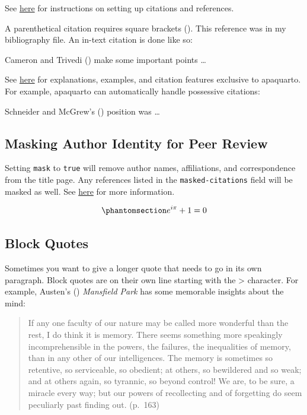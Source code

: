 \documentclass[
  jou,
  floatsintext,
  longtable,
  nolmodern,
  notxfonts,
  notimes,
  colorlinks=true,linkcolor=blue,citecolor=blue,urlcolor=blue]{apa7}
\begin{document}
See
\href{https://quarto.org/docs/authoring/footnotes-and-citations.html}{here}
for instructions on setting up citations and references.

A parenthetical citation requires square brackets
(). This
reference was in my bibliography file. An in-text citation is done like
so:

Cameron and Trivedi () make some
important points \ldots{}

See
\href{https://wjschne.github.io/apaquarto/writing.html\#references}{here}
for explanations, examples, and citation features exclusive to
apaquarto. For example, apaquarto can automatically handle possessive
citations:

Schneider and McGrew's ()
position was \ldots{}

\subsection{Masking Author Identity for Peer
Review}\label{masking-author-identity-for-peer-review}

Setting \texttt{mask} to \texttt{true} will remove author names,
affiliations, and correspondence from the title page. Any references
listed in the \texttt{masked-citations} field will be masked as well.
See
\href{https://wjschne.github.io/apaquarto/writing.html\#masked-citations-for-anonymous-peer-review}{here}
for more information.

\begin{equation}\phantomsection\label{eq-euler}{
e^{i\pi}+1=0
}\end{equation}

\subsection{Block Quotes}\label{block-quotes}

Sometimes you want to give a longer quote that needs to go in its own
paragraph. Block quotes are on their own line starting with the
\textgreater{} character. For example, Austen's
() \emph{Mansfield
Park} has some memorable insights about the mind:

\begin{quote}
If any one faculty of our nature may be called more wonderful than the
rest, I do think it is memory. There seems something more speakingly
incomprehensible in the powers, the failures, the inequalities of
memory, than in any other of our intelligences. The memory is sometimes
so retentive, so serviceable, so obedient; at others, so bewildered and
so weak; and at others again, so tyrannic, so beyond control! We are, to
be sure, a miracle every way; but our powers of recollecting and of
forgetting do seem peculiarly past finding out. (p.~163)
\end{quote}
\end{document}
